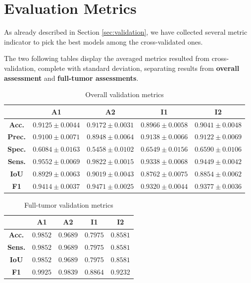 
\section{Evaluation Metrics}

As already described in Section \ref{sec:validation}, we have collected several metric indicator to pick the best models among the cross-validated ones.

The two following tables display the averaged metrics resulted from cross-validation, complete with standard deviation, separating results from \textbf{overall assessment} and \textbf{full-tumor assessments}.

\begin{table}[H]
\centering
\begin{tabular}{|c|c|c|c|c|}
\hline 
& \textbf{A1} & \textbf{A2} & \textbf{I1} & \textbf{I2}
\\ \hline \hline
\textbf{Acc.} & $0.9125 \pm 0.0044$ & \textcolor{mygreen}{$0.9172 \pm 0.0031$} & \textcolor{myred}{$0.8966 \pm 0.0058$} & $0.9041 \pm 0.0048$
\\ \hline
\textbf{Prec.} & $0.9100 \pm 0.0071$ & \textcolor{myred}{$0.8948 \pm 0.0064$} & \textcolor{mygreen}{$0.9138 \pm 0.0066$} & $0.9122 \pm 0.0069$
\\ \hline
\textbf{Spec.} & $0.6084 \pm 0.0163$ & \textcolor{myred}{$0.5458 \pm 0.0102$} & $0.6549 \pm 0.0156$ & \textcolor{mygreen}{$0.6590 \pm 0.0106$}
\\ \hline
\textbf{Sens.} & $0.9552 \pm 0.0069$ & \textcolor{mygreen}{$0.9822 \pm 0.0015$} & \textcolor{myred}{$0.9338 \pm 0.0068$} & $0.9449 \pm 0.0042$
\\ \hline
\textbf{IoU} & $0.8929 \pm 0.0063$ & \textcolor{mygreen}{$0.9019 \pm 0.0043$} & \textcolor{myred}{$0.8762 \pm 0.0075$} & $0.8854 \pm 0.0062$
\\ \hline
\textbf{F1} & $0.9414 \pm 0.0037$ & \textcolor{mygreen}{$0.9471 \pm 0.0025$} & \textcolor{myred}{$0.9320 \pm 0.0044$} & $0.9377 \pm 0.0036$
\\ \hline
\end{tabular}
\caption{Overall validation metrics}
\end{table}

\begin{table}[H]
\centering
\begin{tabular}{|c|c|c|c|c|}
\hline
& \textbf{A1} & \textbf{A2} & \textbf{I1} & \textbf{I2}
\\ \hline \hline
\textbf{Acc.} & \textcolor{mygreen}{$0.9852$} & $0.9689$ & \textcolor{myred}{$0.7975$} & $0.8581$
\\ \hline
\textbf{Sens.} & \textcolor{mygreen}{$0.9852$} & $0.9689$ & \textcolor{myred}{$0.7975$} & $0.8581$
\\ \hline
\textbf{IoU} & \textcolor{mygreen}{$0.9852$} & $0.9689$ & \textcolor{myred}{$0.7975$} & $0.8581$
\\ \hline
\textbf{F1} & \textcolor{mygreen}{$0.9925$} & $0.9839$ & \textcolor{myred}{$0.8864$} & $0.9232$
\\ \hline
\end{tabular}
\caption{Full-tumor validation metrics}
\end{table}

